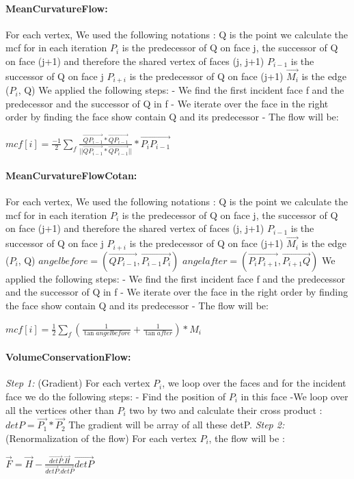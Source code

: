 \documentclass{article}
\begin{document}
\paragraph*{MeanCurvatureFlow:}
For each vertex,
We used the following notations :
Q is the point we calculate the mcf for in each iteration
$P_i$ is the predecessor of Q on face j, the successor of Q on face (j+1) and therefore the shared vertex of faces (j, j+1)
$P_{i-1}$ is the successor of Q on face j
$P_{i+i}$ is the predecessor of Q on face (j+1)
$\overrightarrow{M_i}$ is the edge ($P_i$, Q)
We applied the following steps:
- We find the first incident face f and the predecessor and the successor of Q in f
- We iterate over the face in the right order by finding  the face show contain Q and its predecessor
- The flow will be:
\begin{center}
$mcf[i]=\frac{-1}{2}\sum_{f}^{} \frac{\overrightarrow{QP_{i-1}} *\overrightarrow{QP_{i-1}}}{||\overrightarrow{QP_{i-1}} *\overrightarrow{QP_{i-1}}||} * \overrightarrow{P_iP_{i-1}} $
\end{center}
\paragraph*{MeanCurvatureFlowCotan:}
For each vertex,
We used the following notations :
Q is the point we calculate the mcf for in each iteration
$P_i$ is the predecessor of Q on face j, the successor of Q on face (j+1) and therefore the shared vertex of faces (j, j+1)
$P_{i-1}$ is the successor of Q on face j
$P_{i+i}$ is the predecessor of Q on face (j+1)
$\overrightarrow{M_i}$ is the edge ($P_i$, Q)
$angelbefore = (\overrightarrow{QP_{i-1}},\overrightarrow{P_{i-1}P_{i}})$
$angelafter = (\overrightarrow{P_iP_{i+1}},\overrightarrow{P_{i+1}Q})$
We applied the following steps:
- We find the first incident face f and the predecessor and the successor of Q in f
- We iterate over the face in the right order by finding  the face show contain Q and its predecessor
- The flow will be:
\begin{center}
$mcf[i]= \frac{1}{2}\sum_{f}^{} (\frac{1}{\tan angelbefore}+ \frac{1}{\tan after} ) * M_i$
\end{center}
\paragraph*{VolumeConservationFlow:}
\textit{Step 1:} (Gradient)
For each vertex $P_i$, we loop over the faces and for the incident face we do the following steps:
- Find the position of $P_i$ in this face
-We loop over all the vertices other than $P_i$ two by two and calculate their cross product :\\ $detP= \overrightarrow{P_1} * \overrightarrow{P_2} $
The gradient will be array of all these detP.
\textit{Step 2:} (Renormalization of the flow)
For each vertex $P_i$, the flow will be :
\begin{center}
$\overrightarrow{F}= \overrightarrow{H}- \frac{\overrightarrow{detP}. \overrightarrow{H}}{\overrightarrow{detP}. \overrightarrow{detP}}\overrightarrow{detP}$
\end{center}
\end{document}
